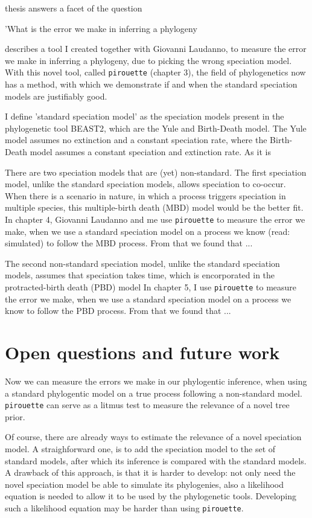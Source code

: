  thesis answers a facet of the question 


'What is the error we make in inferring a phylogeny

describes a tool I created together with Giovanni Laudanno, 
to measure the error we make in inferring a phylogeny, due to
picking the wrong speciation model. 
With this novel tool, called \verb;pirouette; (chapter 3),
the field of phylogenetics now has a method, 
with which we demonstrate if and when the standard speciation models
are justifiably good. 

I define 'standard speciation model' as the speciation models 
present in the phylogenetic tool BEAST2, which are the Yule and
Birth-Death model. The Yule model assumes no extinction
and a constant speciation rate, where the Birth-Death model
assumes a constant speciation and extinction rate. As
it is 

There are two speciation models that are (yet) non-standard.
The first speciation model, 
unlike the standard speciation models, 
allows speciation to co-occur.
When there is a scenario in nature, in which a process triggers speciation
in multiple species, this multiple-birth death (MBD) model would be the better fit. 
In chapter 4, Giovanni Laudanno and me 
use \verb;pirouette; to 
measure the error we make, 
when we use a standard speciation model on a process we know (read: simulated) 
to follow the MBD process.
From that we found that ...

The second non-standard speciation model,
unlike the standard speciation models,
assumes that speciation takes time,
which is encorporated in the protracted-birth death (PBD) model
In chapter 5, I 
use \verb;pirouette; to 
measure the error we make, when we use a standard speciation
model on a process we know to follow the PBD process.
From that we found that ...

\section{Open questions and future work}

Now we can measure the errors we make in our phylogentic
inference, when using a standard phylogentic model on a
true process following a non-standard model. 
\verb;pirouette; can serve as a litmus test 
to measure the relevance of a novel tree prior. 

Of course, there are already ways to estimate the relevance of a
novel speciation model. A straighforward one, is to add the speciation
model to the set of standard models, after which its inference is
compared with the standard models. A drawback of this approach, is
that it is harder to develop: not only need the novel speciation model
be able to simulate its phylogenies, also a likelihood equation is needed
to allow it to be used by the phylogenetic tools. Developing such a
likelihood equation may be harder than using \verb;pirouette;.

